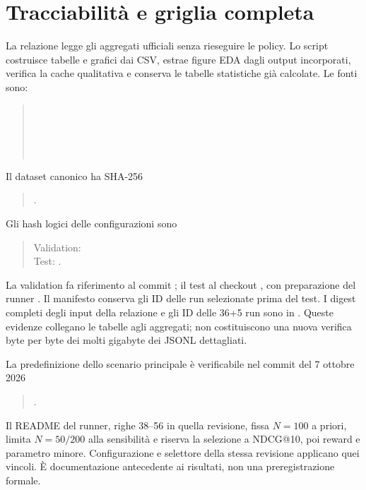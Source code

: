 \chapter{Tracciabilità e griglia completa}\label{app:repro}
La relazione legge gli aggregati ufficiali senza rieseguire le policy. Lo script  costruisce tabelle e grafici dai CSV, estrae figure EDA dagli output incorporati, verifica la cache qualitativa e conserva le tabelle statistiche già calcolate. Le fonti sono:
\begin{quote}\small
{}\\
\\
\\
\\
\end{quote}
Il dataset canonico ha SHA-256
\begin{quote}\small{}.\end{quote}
Gli hash logici delle configurazioni sono
\begin{quote}\small
Validation: \\
Test: .
\end{quote}
La validation fa riferimento al commit ; il test al checkout , con preparazione del runner . Il manifesto conserva gli ID delle run selezionate prima del test. I digest completi degli input della relazione e gli ID delle 36+5 run sono in . Queste evidenze collegano le tabelle agli aggregati; non costituiscono una nuova verifica byte per byte dei molti gigabyte dei JSONL dettagliati.

La predefinizione dello scenario principale è verificabile nel commit del 7 ottobre 2026
\begin{quote}\small{}.\end{quote}
Il README del runner, righe 38--56 in quella revisione, fissa $N=100$ a priori, limita $N=50/200$ alla sensibilità e riserva la selezione a NDCG@10, poi reward e parametro minore. Configurazione e selettore della stessa revisione applicano quei vincoli. È documentazione antecedente ai risultati, non una preregistrazione formale.

